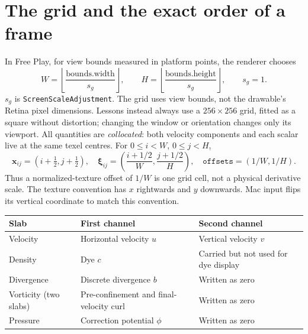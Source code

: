 \documentclass[11pt,a4paper]{article}
\newcommand{\xvec}{\mathbf{x}}
\newcommand{\code}[1]{\texttt{#1}}
\newcommand{\page}[1]{\clearpage\section{#1}}
\begin{document}
\page{The grid and the exact order of a frame}
\begingroup\small
In Free Play, for view bounds measured in platform points, the renderer chooses
\begin{equation}
 W=\left\lfloor\frac{\text{bounds.width}}{s_g}\right\rfloor,\qquad
 H=\left\lfloor\frac{\text{bounds.height}}{s_g}\right\rfloor,\qquad s_g=1.
\end{equation}
$s_g$ is \code{ScreenScaleAdjustment}. The grid uses view bounds, not the
drawable's Retina pixel dimensions. Lessons instead always use a $256\times256$ grid, fitted as a square without distortion; changing the window or orientation changes only its viewport. All quantities are \emph{collocated}: both
velocity components and each scalar live at the same texel centres.
For $0\leq i<W$, $0\leq j<H$,
\begin{equation}
 \xvec_{ij}=(i+\tfrac12,j+\tfrac12),\quad
 \boldsymbol\xi_{ij}=\left(\frac{i+1/2}{W},\frac{j+1/2}{H}\right),\quad
 \texttt{offsets}=(1/W,1/H).
\end{equation}
Thus a normalized-texture offset of $1/W$ is one grid cell, not a physical
derivative scale. The texture convention has $x$ rightwards and $y$ downwards.
Mac input flips its vertical coordinate to match this convention.

\begin{tabularx}{\linewidth}{@{}lYY@{}}
\toprule
Slab & First channel & Second channel \\
\midrule
Velocity & Horizontal velocity $u$ & Vertical velocity $v$ \\
Density & Dye $c$ & Carried but not used for dye display \\
Divergence & Discrete divergence $b$ & Written as zero \\
Vorticity (two slabs) & Pre-confinement and final-velocity curl & Written as zero \\
Pressure & Correction potential $\phi$ & Written as zero \\
\bottomrule
\end{tabularx}
\end{document}
